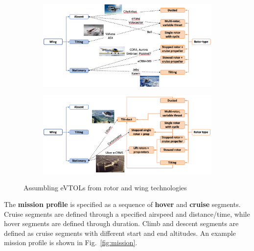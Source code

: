 \begin{figure}
     \centering
     \begin{subfigure}
         \centering
         \includegraphics[width=\textwidth]{images/evtols1.png}
         \label{fig:evtols1}
     \end{subfigure}
     \hfill
     \begin{subfigure}
         \centering
         \includegraphics[width=\textwidth]{images/evtols2.png}
         \label{fig:evtols2}
     \end{subfigure}
        \caption{Assumbling eVTOLs from rotor and wing technologies}
        \label{fig:evtol_types}
\end{figure}

The \textbf{mission profile} is specified as a sequence of \textbf{hover} and \textbf{cruise} segments. Cruise segments are defined through a specified airspeed and distance/time, while hover segments are defined through duration. Climb and descent segments are defined as cruise segments with different start and end altitudes. An example mission profile is shown in Fig.~\ref{fig:mission}. 

